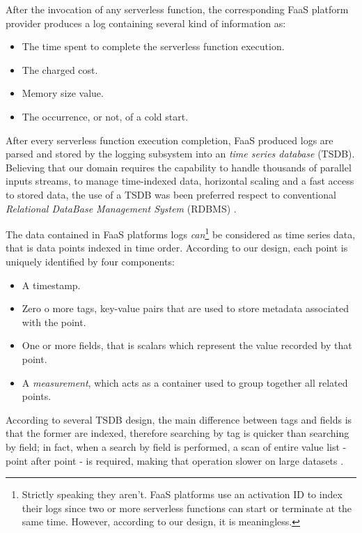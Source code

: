 \documentclass[12pt,a4paper]{report}
\begin{document}
After the invocation of any serverless function, the corresponding FaaS platform provider produces a log containing several kind of information as:   

\begin{itemize}
	\item The time spent to complete the serverless function execution.
	\item The charged cost.
	\item Memory size value.
	\item The occurrence, or not, of a cold start.
\end{itemize}

After every serverless function execution completion, FaaS produced logs are parsed and stored by the logging subsystem into an \textit{time series database} (TSDB). Believing that our domain requires the capability to handle thousands of parallel inputs streams, to manage time-indexed data, horizontal scaling and a fast access to stored data, the use of a TSDB was been preferred respect to conventional \textit{Relational DataBase Management System} (RDBMS) \cite{IOTTSDB}.  

The data contained in FaaS platforms logs \textit{can}\footnote{Strictly speaking they aren't. FaaS platforms use an activation ID to index their logs since two or more serverless functions can start or terminate at the same time. However, according to our design, it is meaningless.} be considered as time series data, that is data points indexed in time order. According to our design, each point is uniquely identified by four components:

\begin{itemize}
	\item A timestamp.
	
	\item Zero o more tags, key-value pairs that are used to store metadata associated with the point. 
	
	\item One or more fields, that is scalars which represent the value recorded by that point.
	
	\item A \textit{measurement}, which acts as a container used to group together all related points.
	
\end{itemize}

According to several TSDB design, the main difference between tags and fields is that the former are indexed, therefore searching by tag is quicker than searching by field; in fact, when a search by field is performed, a scan of entire value list - point after point - is required, making that operation slower on large datasets \cite{IOTTSDB}.
\end{document}
